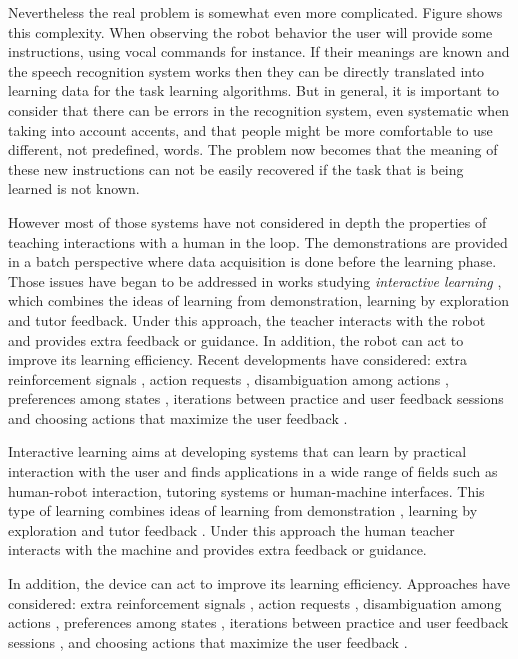 Nevertheless the real problem is somewhat even more complicated. Figure shows this complexity. When observing the robot behavior the user will provide some instructions, using vocal commands for instance. If their meanings are known and the speech recognition system works then they can be directly translated into learning data for the task learning algorithms. But in general, it is important to consider that there can be errors in the recognition system, even systematic when taking into account accents, and that people might be more comfortable to use different, not predefined, words. The problem now becomes that the meaning of these new instructions can not be easily recovered if the task that is being learned is not known.

However most of those systems have not considered in depth the properties of teaching interactions with a human in the loop. The demonstrations are provided in a batch perspective where data acquisition is done before the learning phase. Those issues have began to be addressed in works studying \textit{interactive learning} \cite{kaplan2002robotic,nicolescu2003natural,Breazeal2004,thomaz2008teachable}, which combines the ideas of learning from demonstration, learning by exploration and tutor feedback. Under this approach, the teacher interacts with the robot and provides extra feedback or guidance. In addition, the robot can act to improve its learning efficiency. Recent developments have considered: extra reinforcement signals \cite{thomaz2008teachable}, action requests \cite{macl09airl}, disambiguation among actions \cite{chernova09jair}, preferences among states \cite{Mason2011}, iterations between practice and user feedback sessions \cite{judah2010reinforcement} and choosing actions that maximize the user feedback \cite{knox2009interactively}.

Interactive learning \cite{nicolescu2003natural,breazeal2004tutelage} aims at developing systems that can learn by practical interaction with the user and finds applications in a wide range of fields such as human-robot interaction, tutoring systems or human-machine interfaces.
This type of learning combines ideas of learning from demonstration \cite{argall09survey}, learning by exploration \cite{thrun1992efficient} and tutor feedback \cite{kaplan2002robotic}. Under this approach the human teacher interacts with the machine and provides extra feedback or guidance. 

In addition, the device can act to improve its learning efficiency.
Approaches have considered: extra reinforcement signals \cite{thomaz2008teachable}, action requests \cite{lopes2009active}, disambiguation among actions \cite{chernova09jair}, preferences among states \cite{Mason2011}, iterations between practice and user feedback sessions \cite{judah2010reinforcement}, and choosing actions that maximize the user feedback \cite{knox2009interactively}. 

